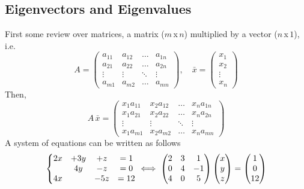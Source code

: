 \documentclass[diffeq.tex]{subfiles}
\begin{document}
    \subsection{Eigenvectors and Eigenvalues}
    First some review over matrices, a matrix ($m$\,x\,$n$) multiplied by a vector ($n$\,x\,$1$), i.e.
    \begin{equation}
        A = \begin{pmatrix}
            a_{11} & a_{12} & \dots & a_{1n}\\
            a_{21} & a_{22} & \dots & a_{2n}\\
            \vdots & \vdots & \ddots & \vdots\\
            a_{m1} & a_{m2} & \dots & a_{mn}
        \end{pmatrix},\quad \bar{x} = \begin{pmatrix}
            x_{1}\\
            x_{2}\\
            \vdots\\
            x_{n}
        \end{pmatrix}
    \end{equation}
    Then,
    \begin{equation}
        A\,\bar{x} = \begin{pmatrix}
            x_{1}a_{11} & x_{2}a_{12} & \dots & x_{n}a_{1n}\\
            x_{1}a_{21} & x_{2}a_{22} & \dots & x_{n}a_{2n}\\
            \vdots & \vdots & \ddots & \vdots\\
            x_{1}a_{m1} & x_{2}a_{m2} & \dots & x_{n}a_{mn}
        \end{pmatrix}
    \end{equation}
    A system of equations can be written as follows
    \begin{equation}
        \left\{\begin{array}{@{}cccc@{}}
            2x &+3y &+ z &= 1\\
            &4y &-z &= 0\\
            4x &&-5z &= 12
            \end{array}\right.
        \iff
        \begin{pmatrix}
            2 & 3 & 1\\
            0 & 4 & -1\\
            4 & 0 & 5
        \end{pmatrix}
        \begin{pmatrix}
            x \\ y \\ z
        \end{pmatrix}
        =
        \begin{pmatrix}
            1 \\ 0 \\ 12
        \end{pmatrix}
    \end{equation}
\end{document}
